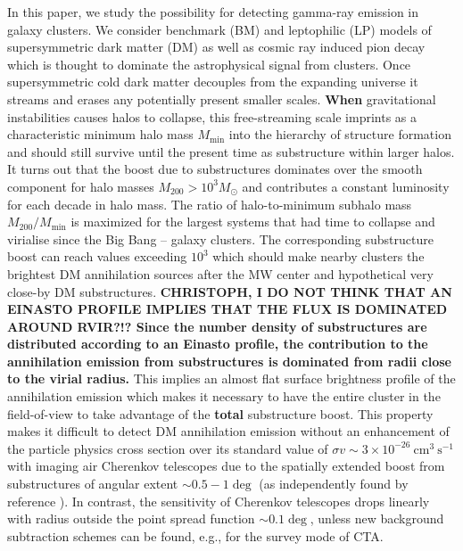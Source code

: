 \documentclass[10pt,aps,pra,reprint,amsmath,amsfonts,amssymb,showpacs,nofootinbib,floatfix]{revtex4-1}
\def\del#1{{}}
\def\C#1{{\bf #1}}
\newcommand{\msun}{M_\odot}
\newcommand{\mvir}{M_{200}}
\begin{document}
In this paper, we study the possibility for detecting gamma-ray
emission in galaxy clusters. We consider benchmark (BM) and
leptophilic (LP) models of supersymmetric dark matter (DM) as well as
cosmic ray induced pion decay which is thought to dominate the
astrophysical signal from clusters. Once supersymmetric cold dark
matter decouples from the expanding universe it streams and erases any
potentially present smaller scales. \C{When} \del{Once} gravitational
instabilities causes halos to collapse, this free-streaming scale
imprints as a characteristic minimum halo mass $M_\mathrm{min}$ into
the hierarchy of structure formation and should still survive until
the present time as substructure within larger halos. It turns out
that the boost due to substructures dominates over the smooth
component for halo masses $\mvir>10^3 \msun$ and contributes a
constant luminosity for each decade in halo mass. The ratio of
halo-to-minimum subhalo mass $\mvir/M_\mathrm{min}$ is maximized for
the largest systems that had time to collapse and virialise since the
Big Bang -- galaxy clusters. The corresponding substructure boost can
reach values exceeding $10^3$ which should make nearby clusters the
brightest DM annihilation sources after the MW center and hypothetical
very close-by DM substructures. \C{CHRISTOPH, I DO NOT THINK THAT AN
  EINASTO PROFILE IMPLIES THAT THE FLUX IS DOMINATED AROUND RVIR?!?
  Since the number density of substructures are distributed according
  to an Einasto profile, the contribution to the annihilation emission
  from substructures is dominated from radii close to the virial
  radius.}  This implies an almost flat surface brightness profile of
the annihilation emission which makes it necessary to have the entire
cluster in the field-of-view to take advantage of the \C{total}
\del{entire} substructure boost. This property makes it difficult to
detect DM annihilation emission without an enhancement of the particle
physics cross section over its standard value of $\sigma v\sim 3\times
10^{-26} ~\mathrm{cm}^3~\mathrm{s}^{-1}$ with imaging air Cherenkov
telescopes due to the spatially extended boost from substructures of
angular extent $\sim 0.5-1\deg$ (as independently found by reference
\cite{2011arXiv1104.3530S}). In contrast, the sensitivity of Cherenkov
telescopes drops linearly with radius outside the point spread
function $\sim 0.1\deg$, unless new background subtraction schemes can
be found, e.g., for the survey mode of CTA.
\end{document}
